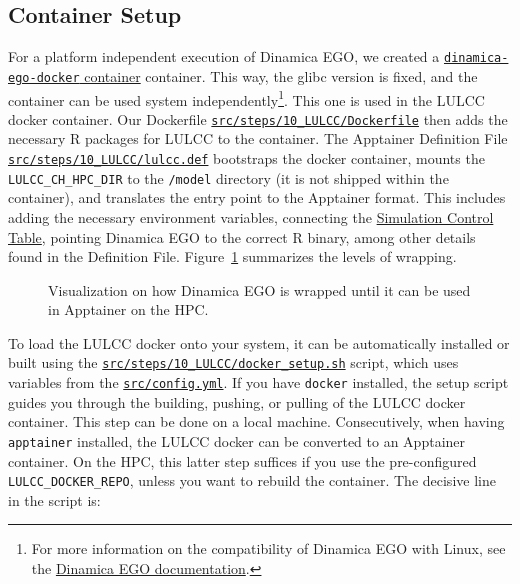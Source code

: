 \documentclass[
  letterpaper,
  DIV=11,
  numbers=noendperiod]{scrreprt}
\begin{document}
\subsection{Container Setup}\label{container-setup}

For a platform independent execution of Dinamica EGO, we created a
\href{https://github.com/cbueth/dinamica-ego-docker/}{\texttt{dinamica-ego-docker}
container} container. This way, the glibc version is fixed, and the
container can be used system independently\footnote{For more information
  on the compatibility of Dinamica EGO with Linux, see the
  \href{https://dinamicaego.com/dokuwiki/doku.php?id=dinamica_linux_compatibility}{Dinamica
  EGO documentation}.}. This one is used in the LULCC docker container.
Our Dockerfile
\href{https://github.com/cbueth/Future-EI/tree/main/src/steps/10_LULCC/Dockerfile}{\texttt{src/steps/10\_LULCC/Dockerfile}}
then adds the necessary R packages for LULCC to the container. The
Apptainer Definition File
\href{https://github.\%20com/cbueth/Future-EI/tree/main/src/steps/10_LULCC/lulcc.def}{\texttt{src/steps/10\_LULCC/lulcc.def}}
bootstraps the docker container, mounts the \texttt{LULCC\_CH\_HPC\_DIR}
to the \texttt{/model} directory (it is not shipped within the
container), and translates the entry point to the Apptainer format. This
includes adding the necessary environment variables, connecting the
\hyperref[simulation-control-table]{Simulation Control Table}, pointing
Dinamica EGO to the correct R binary, among other details found in the
Definition File. Figure~\ref{fig-docker-setup} summarizes the levels of
wrapping.

\begin{figure}


\caption{\label{fig-docker-setup}Visualization on how Dinamica EGO is
wrapped until it can be used in Apptainer on the HPC.}

\end{figure}%

To load the LULCC docker onto your system, it can be automatically
installed or built using the
\href{https://github.com/cbueth/Future-EI/tree/main/src/steps/10_LULCC/docker_setup.sh}{\texttt{src/steps/10\_LULCC/docker\_setup.sh}}
script, which uses variables from the
\href{https://github.com/cbueth/Future-EI/tree/main/src/config.yml}{\texttt{src/config.yml}}.
If you have \texttt{docker} installed, the setup script guides you
through the building, pushing, or pulling of the LULCC docker container.
This step can be done on a local machine. Consecutively, when having
\texttt{apptainer} installed, the LULCC docker can be converted to an
Apptainer container. On the HPC, this latter step suffices if you use
the pre-configured \texttt{LULCC\_DOCKER\_REPO}, unless you want to
rebuild the container. The decisive line in the script is:
\end{document}
